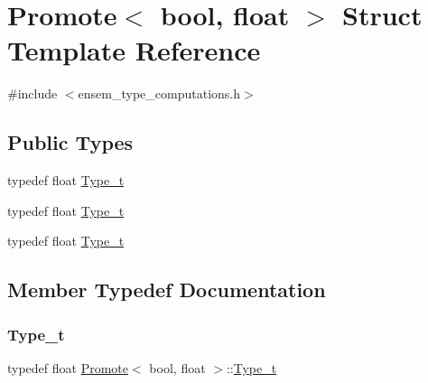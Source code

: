 \hypertarget{structPromote_3_01bool_00_01float_01_4}{}\section{Promote$<$ bool, float $>$ Struct Template Reference}
\label{structPromote_3_01bool_00_01float_01_4}


{\ttfamily \#include $<$ensem\+\_\+type\+\_\+computations.\+h$>$}

\subsection*{Public Types}
\begin{DoxyCompactItemize}
\item 
typedef float \mbox{\hyperlink{structPromote_3_01bool_00_01float_01_4_aa820b07e23d2dd7eee4a2344e3598502}{Type\+\_\+t}}
\item 
typedef float \mbox{\hyperlink{structPromote_3_01bool_00_01float_01_4_aa820b07e23d2dd7eee4a2344e3598502}{Type\+\_\+t}}
\item 
typedef float \mbox{\hyperlink{structPromote_3_01bool_00_01float_01_4_aa820b07e23d2dd7eee4a2344e3598502}{Type\+\_\+t}}
\end{DoxyCompactItemize}


\subsection{Member Typedef Documentation}
\mbox{\label{structPromote_3_01bool_00_01float_01_4_aa820b07e23d2dd7eee4a2344e3598502}} 
\subsubsection{\texorpdfstring{Type\_t}{Type\_t}\hspace{0.1cm}{\footnotesize\ttfamily [1/3]}}
{\footnotesize\ttfamily typedef float \mbox{\hyperlink{structPromote}{Promote}}$<$ bool, float $>$\+::\mbox{\hyperlink{structPromote_3_01bool_00_01float_01_4_aa820b07e23d2dd7eee4a2344e3598502}{Type\+\_\+t}}}

\mbox{\label{structPromote_3_01bool_00_01float_01_4_aa820b07e23d2dd7eee4a2344e3598502}} 
